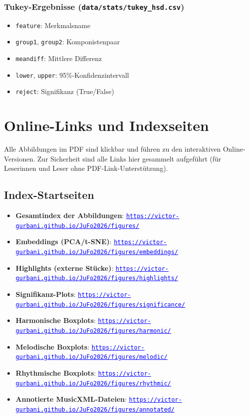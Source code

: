 \documentclass[10pt,a4paper]{article}
\theoremstyle{definition}
\newcommand{\linkurl}[1]{\href{#1}{\textcolor{blue}{\underline{\small\nolinkurl{#1}}}}}
\begin{document}
\subsubsection{Tukey-Ergebnisse (\texttt{data/stats/tukey\_hsd.csv})}
\begin{itemize}
    \item \texttt{feature}: Merkmalsname
    \item \texttt{group1}, \texttt{group2}: Komponistenpaar
    \item \texttt{meandiff}: Mittlere Differenz
    \item \texttt{lower}, \texttt{upper}: 95\%-Konfidenzintervall
    \item \texttt{reject}: Signifikanz (True/False)
\end{itemize}

\clearpage
\section{Online-Links und Indexseiten}\label{app:C}


Alle Abbildungen im PDF sind klickbar und führen zu den interaktiven Online-Versionen. Zur Sicherheit sind alle Links hier gesammelt aufgeführt (für Leserinnen und Leser ohne PDF-Link-Unterstützung).

\subsection{Index-Startseiten}
\begin{itemize}
    \item \textbf{Gesamtindex der Abbildungen}: \newline\linkurl{https://victor-gurbani.github.io/JuFo2026/figures/}
    \item \textbf{Embeddings (PCA/t-SNE)}: \newline\linkurl{https://victor-gurbani.github.io/JuFo2026/figures/embeddings/}
    \item \textbf{Highlights (externe Stücke)}: \newline\linkurl{https://victor-gurbani.github.io/JuFo2026/figures/highlights/}
    \item \textbf{Signifikanz-Plots}: \newline\linkurl{https://victor-gurbani.github.io/JuFo2026/figures/significance/}
    \item \textbf{Harmonische Boxplots}: \newline\linkurl{https://victor-gurbani.github.io/JuFo2026/figures/harmonic/}
    \item \textbf{Melodische Boxplots}: \newline\linkurl{https://victor-gurbani.github.io/JuFo2026/figures/melodic/}
    \item \textbf{Rhythmische Boxplots}: \newline\linkurl{https://victor-gurbani.github.io/JuFo2026/figures/rhythmic/}
    \item \textbf{Annotierte MusicXML-Dateien}: \newline\linkurl{https://victor-gurbani.github.io/JuFo2026/figures/annotated/}
\end{itemize}
\end{document}
